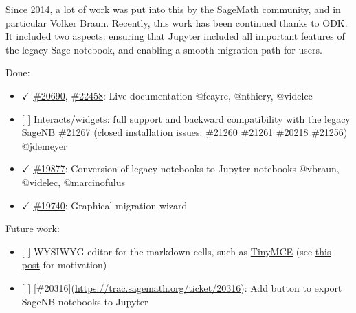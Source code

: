 Since 2014, a lot of work was put into this by the SageMath community,
and in particular Volker Braun. Recently, this work has been continued
thanks to ODK. It included two aspects: ensuring that Jupyter included
all important features of the legacy Sage notebook, and enabling a
smooth migration path for users.

Done:

\begin{itemize}
\tightlist
\item
  \(\checkmark\) \href{http://trac.sagemath.org/ticket/20690}{\#20690},
  \href{http://trac.sagemath.org/ticket/22458}{\#22458}: Live
  documentation @fcayre, @nthiery, @videlec
\item
  {[} {]} Interacts/widgets: full support and backward compatibility
  with the legacy SageNB
  \href{https://trac.sagemath.org/ticket/21267}{\#21267} (closed
  installation issues:
  \href{https://trac.sagemath.org/ticket/21260}{\#21260}
  \href{https://trac.sagemath.org/ticket/21261}{\#21261}
  \href{https://trac.sagemath.org/ticket/20218}{\#20218}
  \href{https://trac.sagemath.org/ticket/21256}{\#21256}) @jdemeyer
\item
  \(\checkmark\) \href{https://trac.sagemath.org/ticket/19877}{\#19877}:
  Conversion of legacy notebooks to Jupyter notebooks @vbraun, @videlec,
  @marcinofulus
\item
  \(\checkmark\) \href{https://trac.sagemath.org/ticket/19740}{\#19740}:
  Graphical migration wizard
\end{itemize}

Future work:

\begin{itemize}
\tightlist
\item
  {[} {]} WYSIWYG editor for the markdown cells, such as
  \href{https://www.tinymce.com/}{TinyMCE} (see
  \href{https://groups.google.com/d/msg/sage-devel/t11JSxxCgpw/BR0Bt638AgAJ}{this
  post} for motivation)
\item
  {[} {]} {[}\#20316{]}(\url{https://trac.sagemath.org/ticket/20316}):
  Add button to export SageNB notebooks to Jupyter
\end{itemize}
